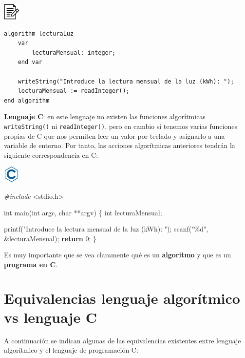 \documentclass[
]{book}
\newenvironment{Shaded}{\begin{snugshade}}{\end{snugshade}}
\newcommand{\ControlFlowTok}[1]{\textcolor[rgb]{0.13,0.29,0.53}{\textbf{#1}}}
\newcommand{\DataTypeTok}[1]{\textcolor[rgb]{0.13,0.29,0.53}{#1}}
\newcommand{\DecValTok}[1]{\textcolor[rgb]{0.00,0.00,0.81}{#1}}
\newcommand{\ImportTok}[1]{#1}
\newcommand{\NormalTok}[1]{#1}
\newcommand{\PreprocessorTok}[1]{\textcolor[rgb]{0.56,0.35,0.01}{\textit{#1}}}
\newcommand{\StringTok}[1]{\textcolor[rgb]{0.31,0.60,0.02}{#1}}
\begin{document}
\includegraphics{./img/alg.png}

\begin{verbatim}
algorithm lecturaLuz
    var
        lecturaMensual: integer;
    end var

    writeString("Introduce la lectura mensual de la luz (kWh): ");
    lecturaMensual := readInteger();
end algorithm
\end{verbatim}

\textbf{Lenguaje C}: en este lenguaje no existen las funciones algorítmicas \texttt{writeString()} ni \texttt{readInteger()}, pero en cambio sí tenemos varias funciones propias de C que nos permiten leer un valor por teclado y asignarlo a una variable de entorno. Por tanto, las acciones algorítmicas anteriores tendrán la siguiente correspondencia en C:

\includegraphics{./img/c.png}

\begin{Shaded}
\begin{Highlighting}[]
\PreprocessorTok{\#include }\ImportTok{\textless{}stdio.h\textgreater{}}

\DataTypeTok{int}\NormalTok{ main(}\DataTypeTok{int}\NormalTok{ argc, }\DataTypeTok{char}\NormalTok{ **argv) \{ }
    \DataTypeTok{int}\NormalTok{ lecturaMensual;}

\NormalTok{    printf(}\StringTok{"Introduce la lectura mensual de la luz (kWh): "}\NormalTok{);}
\NormalTok{    scanf(}\StringTok{"\%d"}\NormalTok{, \&lecturaMensual);}
    \ControlFlowTok{return} \DecValTok{0}\NormalTok{;}
\NormalTok{\}}
\end{Highlighting}
\end{Shaded}

Es muy importante que se vea claramente qué es un \textbf{algoritmo} y que es un \textbf{programa en C}.

\hypertarget{equivalencias-lenguaje-algoruxedtmico-vs-lenguaje-c}{%
\section{Equivalencias lenguaje algorítmico vs lenguaje C}\label{equivalencias-lenguaje-algoruxedtmico-vs-lenguaje-c}}

A continuación se indican algunas de las equivalencias existentes entre lenguaje algorítmico y el lenguaje de programación C:
\end{document}
